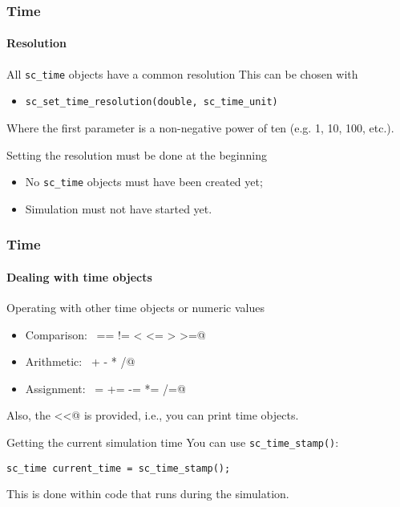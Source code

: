\begin{frame}
\frametitle{Time}
\framesubtitle{Resolution}

\begin{block}{All \texttt{sc\_time} objects have a common resolution}
This can be chosen with
\begin{itemize}
\item \texttt{sc\_set\_time\_resolution(double, sc\_time\_unit)}
\end{itemize}
Where the first parameter is a non-negative power of ten (e.g. 1, 10, 100, etc.).
\end{block}
\pause
\begin{block}{Setting the resolution must be done at the beginning}
\begin{itemize}
\item No \texttt{sc\_time} objects must have been created yet;
\item Simulation must not have started yet.
\end{itemize}
\end{block}
\end{frame}

\begin{frame}[fragile]
\frametitle{Time}
\framesubtitle{Dealing with time objects}

\begin{block}{Operating with other time objects or numeric values}
\begin{itemize}
\item Comparison: \, \verb@== != < <= > >=@
\item Arithmetic: \, \verb@+ - * /@
\item Assignment: \, \verb@= += -= *= /=@
\end{itemize}
Also, the \verb@operator<<@ is provided, i.e., you can print time objects.
\end{block}
\pause
\begin{block}{Getting the current simulation time}
You can use \verb+sc_time_stamp()+: \\
\begin{verbatim}
sc_time current_time = sc_time_stamp();
\end{verbatim}
This is done within code that runs during the simulation.
\end{block}
\end{frame}

